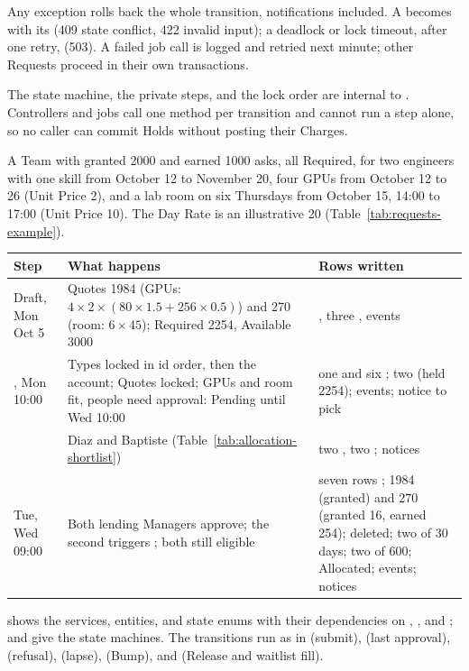 Any exception rolls back the whole transition, notifications included. A  becomes  with its  (409 state conflict, 422 invalid input); a deadlock or lock timeout, after one retry,  (503). A failed job call is logged and retried next minute; other Requests proceed in their own transactions.

The state machine, the private steps, and the lock order are internal to . Controllers and jobs call one method per transition and cannot run a step alone, so no caller can commit Holds without posting their Charges.

A Team with granted 2000 and earned 1000 asks, all Required, for two engineers with one skill from October 12 to November 20, four GPUs from October 12 to 26 (Unit Price 2), and a lab room on six Thursdays from October 15, 14:00 to 17:00 (Unit Price 10). The Day Rate is an illustrative 20 (Table~\ref{tab:requests-example}).
\begin{center}\footnotesize
{}\label{tab:requests-example}
\begin{tabularx}{\textwidth}{@{}L{2.3cm}Y Y@{}}
\toprule
Step & What happens & Rows written \\
\midrule
Draft, Mon Oct 5 & Quotes 1984 (GPUs: $4 \times 2 \times (80 \times 1.5 + 256 \times 0.5)$) and 270 (room: $6 \times 45$); Required 2254, Available 3000 & , three , events \\
, Mon 10:00 & Types locked in id order, then the account; Quotes locked; GPUs and room fit, people need approval: Pending until Wed 10:00 & one  and six  ; two  (held 2254); events; notice to pick \\
 & Diaz and Baptiste (Table~\ref{tab:allocation-shortlist}) & two , two ; notices \\
 Tue, Wed 09:00 & Both lending Managers approve; the second triggers ; both still eligible & seven rows ;  1984 (granted) and 270 (granted 16, earned 254);  deleted; two  of 30 days; two  of 600; Allocated; events; notices \\
\bottomrule
\end{tabularx}
\end{center}

 shows the services, entities, and state enums with their dependencies on , , and ;  and  give the state machines. The transitions run as in  (submit),  (last approval),  (refusal),  (lapse),  (Bump), and  (Release and waitlist fill).

